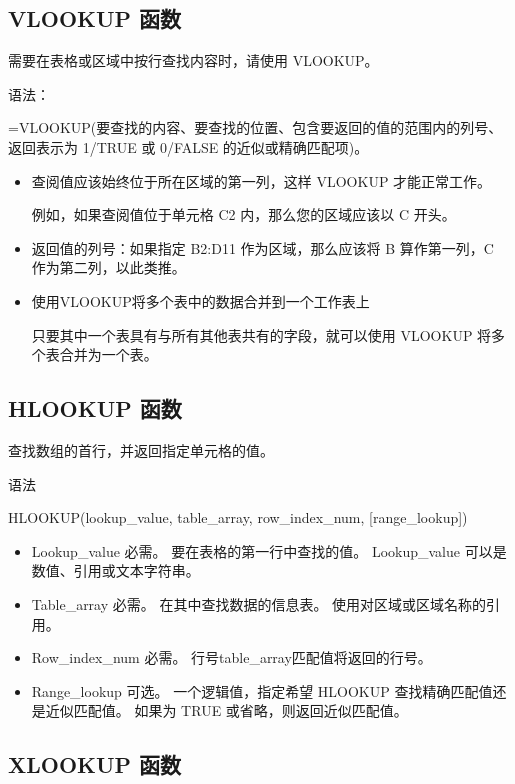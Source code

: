 \subsection{VLOOKUP 函数}

需要在表格或区域中按行查找内容时，请使用 VLOOKUP。

语法：

=VLOOKUP(要查找的内容、要查找的位置、包含要返回的值的范围内的列号、返回表示为 1/TRUE 或 0/FALSE 的近似或精确匹配项)。

\begin{itemize}
    \item 查阅值应该始终位于所在区域的第一列，这样 VLOOKUP 才能正常工作。 
    
    例如，如果查阅值位于单元格 C2 内，那么您的区域应该以 C 开头。
    \item 返回值的列号：如果指定 B2:D11 作为区域，那么应该将 B 算作第一列，C 作为第二列，以此类推。
    \item 使用VLOOKUP将多个表中的数据合并到一个工作表上
    
    只要其中一个表具有与所有其他表共有的字段，就可以使用 VLOOKUP 将多个表合并为一个表。
\end{itemize}

\subsection{HLOOKUP 函数}

查找数组的首行，并返回指定单元格的值。

语法

HLOOKUP(lookup\_value, table\_array, row\_index\_num, [range\_lookup])

\begin{itemize}
    \item Lookup\_value    必需。 要在表格的第一行中查找的值。 Lookup\_value 可以是数值、引用或文本字符串。
    \item Table\_array    必需。 在其中查找数据的信息表。 使用对区域或区域名称的引用。
    \item Row\_index\_num    必需。 行号table\_array匹配值将返回的行号。
    \item Range\_lookup    可选。 一个逻辑值，指定希望 HLOOKUP 查找精确匹配值还是近似匹配值。 如果为 TRUE 或省略，则返回近似匹配值。
\end{itemize}

\subsection{XLOOKUP 函数}

